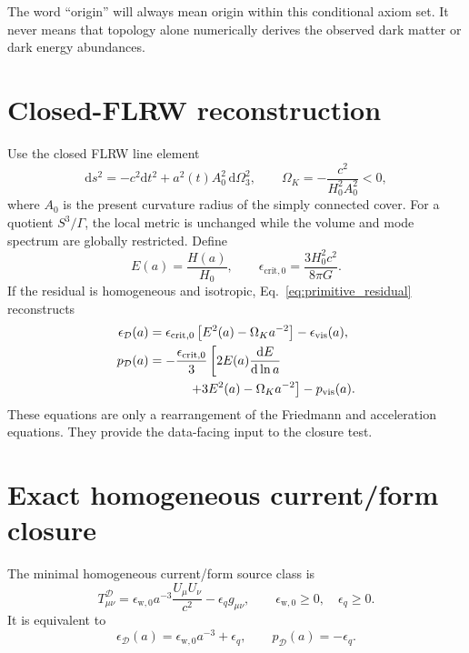 \documentclass[
  aps,
  prd,
  reprint,
  superscriptaddress,
  floatfix,
  nofootinbib,
  longbibliography
]{revtex4-2}
\theoremstyle{plain}
\theoremstyle{definition}
\theoremstyle{remark}
\newcommand{\dd}{\mathrm d}
\newcommand{\D}{\mathcal D}
\newcommand{\vis}{\mathrm{vis}}
\newcommand{\w}{\mathrm w}
\newcommand{\crit}{\mathrm{crit}}
\newcommand{\Ok}{\Omega_K}
\newcommand{\eps}{\epsilon}
\begin{document}
The word ``origin'' will always mean origin within this conditional axiom set.  It never means that topology alone numerically derives the observed dark matter or dark energy abundances.

\section{Closed-FLRW reconstruction}

Use the closed FLRW line element
\begin{equation}
\dd s^2=-c^2\dd t^2+a^2(t)A_0^2\,\dd\Omega_3^2,
\qquad
\Ok=-\frac{c^2}{H_0^2A_0^2}<0 ,
\label{eq:closed_metric}
\end{equation}
where \(A_0\) is the present curvature radius of the simply connected cover.  For a quotient \(S^3/\Gamma\), the local metric is unchanged while the volume and mode spectrum are globally restricted.  Define
\begin{equation}
E(a)=\frac{H(a)}{H_0},
\qquad
\eps_{\crit,0}=\frac{3H_0^2c^2}{8\pi G}.
\label{eq:E_epscrit}
\end{equation}
If the residual is homogeneous and isotropic, Eq.~\eqref{eq:primitive_residual} reconstructs
\begin{align}
\eps_\D(a)
&=
\eps_{\crit,0}\left[E^2(a)-\Ok a^{-2}\right]
-\eps_{\vis}(a),
\label{eq:eps_reconstruction}
\\
p_\D(a)
&=
-\frac{\eps_{\crit,0}}{3}
\left[
2E(a)\frac{\dd E}{\dd\ln a}
\right.
\nonumber\\
&\left.
\hspace{1.1cm}
+3E^2(a)-\Ok a^{-2}
\right]
-p_{\vis}(a).
\label{eq:p_reconstruction}
\end{align}
These equations are only a rearrangement of the Friedmann and acceleration equations.  They provide the data-facing input to the closure test.

\section{Exact homogeneous current/form closure}

The minimal homogeneous current/form source class is
\begin{equation}
T^\D_{\mu\nu}
=
\eps_{\w,0}a^{-3}\frac{U_\mu U_\nu}{c^2}
-\eps_q g_{\mu\nu},
\qquad
\eps_{\w,0}\ge0,\quad \eps_q\ge0 .
\label{eq:current_form_tensor}
\end{equation}
It is equivalent to
\begin{equation}
\eps_\D(a)=\eps_{\w,0}a^{-3}+\eps_q,
\qquad
p_\D(a)=-\eps_q .
\label{eq:current_form_eps_p}
\end{equation}
\end{document}
